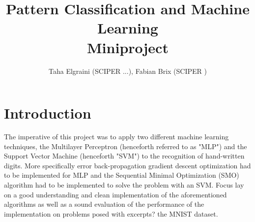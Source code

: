 \documentclass[10pt,a4paper]{article}
\title{Pattern Classification and Machine Learning\\\Huge Miniproject}
\author{Taha Elgraini (SCIPER \textnumero ...), Fabian Brix (SCIPER \textnumero 236334)}
\begin{document}
\maketitle

\section{Introduction}
The imperative of this project was to apply two different machine learning techniques, the Multilayer Perceptron (henceforth referred to as "MLP") and the Support Vector Machine (henceforth "SVM") to the recognition of hand-written digits. More specifically error back-propagation gradient descent optimization had to be implemented for MLP and the Sequential Minimal Optimization (SMO) algorithm had to be implemented to solve the problem with an SVM. Focus lay on a good understanding and clean implementation of the aforementioned algorithms as well as a sound evaluation of the performance of the implementation on problems posed with excerpts? the MNIST dataset.


\end{document}
